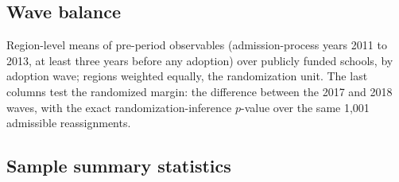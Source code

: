 \documentclass[
]{article}
\begin{document}
\hypertarget{wave-balance}{%
\subsection{Wave balance}\label{wave-balance}}

Region-level means of pre-period observables (admission-process years
2011 to 2013, at least three years before any adoption) over publicly
funded schools, by adoption wave; regions weighted equally, the
randomization unit. The last columns test the randomized margin: the
difference between the 2017 and 2018 waves, with the exact
randomization-inference \(p\)-value over the same 1,001 admissible
reassignments.

\begin{table}[htbp]
   \caption{Pre-Period Balance by Adoption Wave}\label{tab: wave balance}
   \centerline{}
\end{table}

\hypertarget{sample-summary-statistics}{%
\subsection{Sample summary statistics}\label{sample-summary-statistics}}
\end{document}
